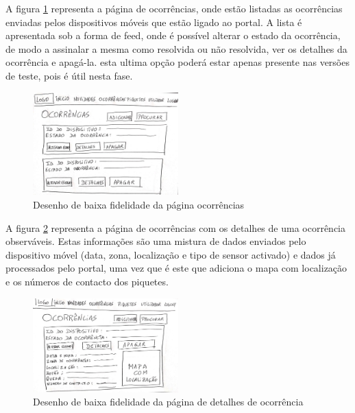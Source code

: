 \FloatBarrier
A figura \ref{fig:ocorrencias} representa a página de ocorrências, onde estão listadas as ocorrências enviadas pelos dispositivos móveis que estão ligado ao portal. A lista é apresentada sob a forma de feed, onde é possível alterar o estado da ocorrência, de modo a assinalar a mesma como resolvida ou não resolvida, ver os detalhes da ocorrência e apagá-la. esta ultima opção poderá estar apenas presente nas versões de teste, pois é útil nesta fase.
\begin{figure}[!htb]
\centering
\includegraphics[width=0.5\textwidth, frame]{figuras/storyboard/frame_4.jpg}
\caption{Desenho de baixa fidelidade da página ocorrências}
\label{fig:ocorrencias}
\end{figure}

\FloatBarrier
A figura \ref{fig:ocorrência_detalhes} representa a página de ocorrências com os detalhes de uma ocorrência observáveis. Estas informações são uma mistura de dados enviados pelo dispositivo móvel (data, zona, localização e tipo de sensor activado) e dados já processados pelo portal, uma vez que é este que adiciona o mapa com localização e os números de contacto dos piquetes.
\begin{figure}[!htb]
	\centering
	\includegraphics[width=0.5\textwidth, frame]{figuras/storyboard/frame_5.jpg}
	\caption{Desenho de baixa fidelidade da página de detalhes de ocorrência}
	\label{fig:ocorrência_detalhes}
\end{figure}

